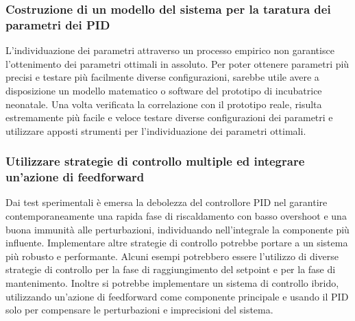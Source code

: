 \subsubsection{Costruzione di un modello del sistema per la taratura dei parametri dei PID}
L'individuazione dei parametri attraverso un processo empirico non garantisce l'ottenimento dei parametri ottimali in
assoluto. Per poter ottenere parametri più precisi e testare più facilmente diverse configurazioni, sarebbe utile avere
a disposizione un modello matematico o software del prototipo di incubatrice neonatale. Una volta verificata la correlazione
con il prototipo reale, risulta estremamente più facile e veloce testare diverse configurazioni dei parametri e utilizzare
apposti strumenti per l'individuazione dei parametri ottimali.

\subsubsection{Utilizzare strategie di controllo multiple ed integrare un'azione di feedforward}
Dai test sperimentali è emersa la debolezza del controllore PID nel garantire contemporaneamente una rapida fase di
riscaldamento con basso overshoot e una buona immunità alle perturbazioni, individuando nell'integrale la componente
più influente. Implementare altre strategie di controllo potrebbe portare a un sistema più robusto e performante.
Alcuni esempi potrebbero essere l'utilizzo di diverse strategie di controllo per la fase di raggiungimento del setpoint
e per la fase di mantenimento. Inoltre si potrebbe implementare un sistema di controllo ibrido, utilizzando un'azione
di feedforward come componente principale e usando il PID solo per compensare le perturbazioni e imprecisioni del sistema.
